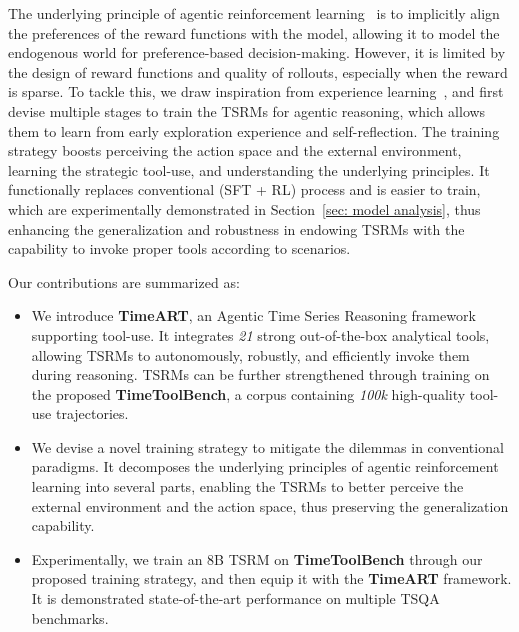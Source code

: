 The underlying principle of agentic reinforcement learning~\citep{zhang2509landscape} is to implicitly align the preferences of the reward functions with the model, allowing it to model the endogenous world for preference-based decision-making. However, it is limited by the design of reward functions and quality of rollouts, especially when the reward is sparse. To tackle this, we draw inspiration from experience learning~\citep{zhang2025agent,fang2025play2prompt,tang2025chemagent}, and first devise multiple stages to train the TSRMs for agentic reasoning, which allows them to learn from early exploration experience and self-reflection. The training strategy boosts perceiving the action space and the external environment, learning the strategic tool-use, and understanding the underlying principles. It functionally replaces conventional (SFT + RL) process and is easier to train, which are experimentally demonstrated in Section~\ref{sec: model analysis}, thus enhancing the generalization and robustness in endowing TSRMs with the capability to invoke proper tools according to scenarios.

Our contributions are summarized as:

\begin{itemize}[left=0.1cm]
\item We introduce \textbf{TimeART}, an Agentic Time Series Reasoning framework supporting tool-use. It integrates \textit{21} strong out-of-the-box analytical tools, allowing TSRMs to autonomously, robustly, and efficiently invoke them during reasoning. TSRMs can be further strengthened through training on the proposed \textbf{TimeToolBench}, a corpus containing \textit{100k} high-quality tool-use trajectories.

\item We devise a novel training strategy to mitigate the dilemmas in conventional paradigms. It decomposes the underlying principles of agentic reinforcement learning into several parts, enabling the TSRMs to better perceive the external environment and the action space, thus preserving the generalization capability. 

\item Experimentally, we train an 8B TSRM on \textbf{TimeToolBench} through our proposed training strategy, and then equip it with the \textbf{TimeART} framework. It is demonstrated state-of-the-art performance on multiple TSQA benchmarks. 

\end{itemize}